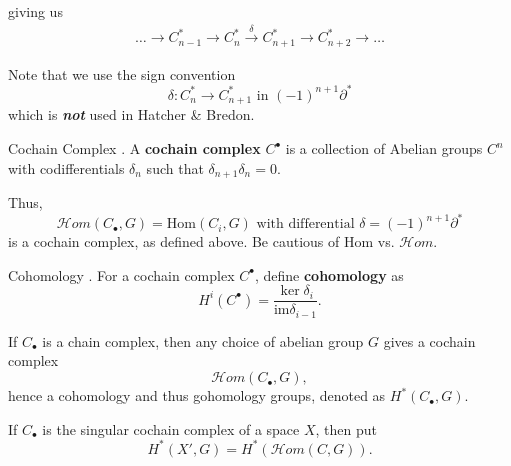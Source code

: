 \documentclass{article}
\begin{document}
giving us 
\begin{align}
\label{eq:2}
  \dots \rightarrow C_{n - 1}^{*} \rightarrow C_n^{*} \xrightarrow{\delta} C_{n + 1}^{*} \rightarrow C_{n+2}^{*} \rightarrow \dots
\end{align}

Note that we use the sign convention
\begin{equation}
  \delta : C_n^{*} \rightarrow C_{n+1}^{*} \text{ in } (-1)^{n + 1}\partial^{*}
\end{equation}
which is \textbf{\textit{not}} used in Hatcher \& Bredon.

\begin{Definition}{Cochain Complex}
. A \textbf{cochain complex} $C^{\bullet}$ is a collection of Abelian groups $C^n$ with codifferentials $\delta_n$ such that $\delta_{n + 1}\delta_n = 0$.
\end{Definition}

Thus,
\begin{equation}
  \mathcal{H}om(C_{\bullet}, G) = \text{Hom}(C_i, G) \text{ with differential } \delta = (-1)^{n + 1}\partial^{*}
\end{equation}
is a cochain complex, as defined above. Be cautious of $\text{Hom}$ vs. $\mathcal{H}om$.

\begin{Definition}{Cohomology}
. For a cochain complex $C^{\bullet}$, define \textbf{cohomology} as
\begin{equation}
  H^i(C^{\bullet}) = \frac{\ker \delta_i}{\text{im} \delta_{i-1}}.
\end{equation}
\end{Definition}

If $C_{\bullet}$ is a chain complex, then any choice of abelian group $G$ gives a cochain complex
\begin{equation}
  \mathcal{H}om(C_{\bullet}, G),
\end{equation}
hence a cohomology and thus gohomology groups, denoted as $H^{*}(C_{\bullet}, G)$.

If $C_{\bullet}$ is the singular cochain complex of a space $X$, then put
\begin{equation}
  H^{*}(X', G) = H^{*}(\mathcal{H}om(C, G)).
\end{equation}
\end{document}
